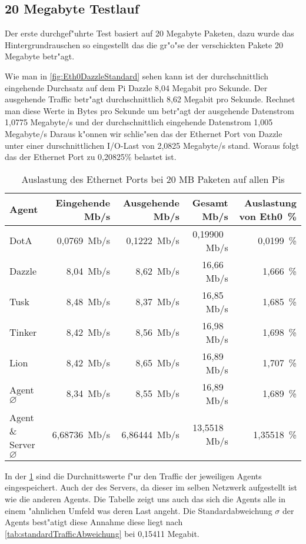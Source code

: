 \subsection{20 Megabyte Testlauf}
\label{subsec:20MBTest}
Der erste durchgef"uhrte Test basiert auf 20 Megabyte Paketen, dazu wurde das Hintergrundrauschen %
so eingestellt das die gr"o"se der verschickten Pakete 20 Megabyte betr"agt. 

Wie man in \cref{fig:Eth0DazzleStandard} sehen kann ist der durchschnittlich eingehende Durchsatz auf dem Pi Dazzle 8,04 Megabit %
pro Sekunde. Der ausgehende Traffic betr"agt durchschnittlich 8,62 Megabit pro Sekunde. Rechnet man diese Werte in Bytes pro Sekunde um %
betr"agt der ausgehende Datenstrom 1,0775 Megabyte/s und der durchschnittlich eingehende Datenstrom 1,005 Megabyte/s %
Daraus k"onnen wir schlie"sen das der Ethernet Port von Dazzle unter einer durschnittlichen I/O-Last von 2,0825 Megabyte/s stand. %
Woraus folgt das der Ethernet Port zu 0,20825\% belastet ist.
\begin{table}
\centering
\begin{tabular}{l%
 r<{\,Mb/s}%
 r<{\,Mb/s}%
 r<{\,Mb/s}%
 r<{\,\%}%
}
Agent  				& Eingehende		& Ausgehende		& Gesamt		& Auslastung von Eth0	\\
\hline
DotA				& 0,0769		& 0,1222		& 0,19900		& 0,0199 		\\
Dazzle 				& 8,04 			& 8,62			& 16,66 		& 1,666			\\
Tusk 				& 8,48			& 8,37			& 16,85			& 1,685			\\
Tinker				& 8,42			& 8,56			& 16,98			& 1,698			\\
Lion				& 8,42			& 8,65			& 16,89			& 1,707			\\ 
Agent $\diameter $	 	& 8,34			& 8,55 			& 16,89			& 1,689 		\\   
Agent \& Server $\diameter$   	& 6,68736		& 6,86444		& 13,5518		& 1,35518		\\ 

\end{tabular}
\caption{Auslastung des Ethernet Ports bei 20 MB Paketen auf allen Pis}
\label{tab:standardTraffic}
\end{table}

In der \cref{tab:standardTraffic} sind die Durchnittswerte f"ur den Traffic der jeweiligen Agents eingespeichert. Auch der %
des Servers, da dieser im selben Netzwerk aufgestellt ist wie die anderen Agents. Die Tabelle zeigt uns auch %
das sich die Agents alle in einem "ahnlichen Umfeld was deren Last angeht. Die Standardabweichung $\sigma$ der Agents %
best"atigt diese Annahme diese liegt nach \cref{tab:standardTrafficAbweichung} bei 0,15411 Megabit.     

